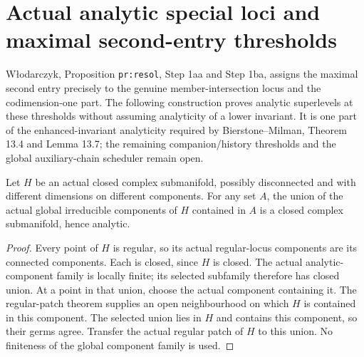 \section{Actual analytic special loci and maximal second-entry thresholds}

W{\l}odarczyk\cite{wlodarczyk05-hironaka}, Proposition
\texttt{pr:resol}, Step 1aa and Step 1ba, assigns the maximal second
entry precisely to the genuine member-intersection locus and the
codimension-one part. The following construction proves analytic
superlevels at these thresholds without assuming analyticity of a
lower invariant. It is one part of the enhanced-invariant analyticity
required by Bierstone--Milman\cite{bierstone-milman97-invent-math},
Theorem 13.4 and Lemma 13.7; the remaining companion/history thresholds
and the global auxiliary-chain scheduler remain open.

\begin{lemma}
\label{hir:smooth-selected-components}
\leanok
Let $H$ be an actual closed complex submanifold, possibly disconnected
and with different dimensions on different components. For any set $A$,
the union of the actual global irreducible components of $H$ contained
in $A$ is a closed complex submanifold, hence analytic.
\end{lemma}
\begin{proof}
Every point of $H$ is regular, so its actual regular-locus components
are its connected components. Each is closed, since $H$ is closed.
The actual analytic-component family is locally finite; its selected
subfamily therefore has closed union. At a point in that union, choose
the actual component containing it. The regular-patch theorem supplies
an open neighbourhood on which $H$ is contained in this component.
The selected union lies in $H$ and contains this component, so their
germs agree. Transfer the actual regular patch of $H$ to this union.
No finiteness of the global component family is used.
\end{proof}

